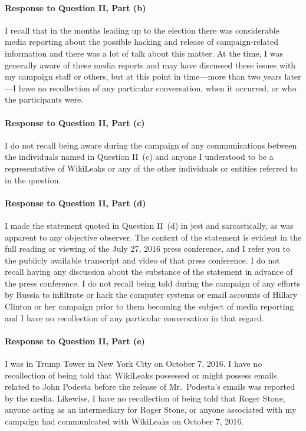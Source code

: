 \paragraph*{Response to Question II, Part (b)}

I recall that in the months leading up to the election there was considerable media reporting about the possible hacking and release of campaign-related information and there was a lot of talk about this matter.
At the time, I was generally aware of these media reports and may have discussed these issues with my campaign staff or others, but at this point in time---more than two years later---I have no recollection of any particular conversation, when it occurred, or who the participants were.

\paragraph*{Response to Question II, Part (c)}

I do not recall being aware during the campaign of any communications between the individuals named in Question II~(c) and anyone I understood to be a representative of WikiLeaks or any of the other individuals or entities referred to in the question.

\paragraph*{Response to Question II, Part (d)}

I made the statement quoted in Question II~(d) in jest and sarcastically, as was apparent to any objective observer.
The context of the statement is evident in the full reading or viewing of the July 27, 2016 press conference, and I refer you to the publicly available transcript and video of that press conference.
I do not recall having any discussion about the substance of the statement in advance of the press conference.
I do not recall being told during the campaign of any efforts by Russia to infiltrate or hack the computer systems or email accounts of Hillary Clinton or her campaign prior to them becoming the subject of media reporting and I have no recollection of any particular conversation in that regard.

\paragraph*{Response to Question II, Part (e)}

I was in Trump Tower in New York City on October 7, 2016.
I have no recollection of being told that WikiLeaks possessed or might possess emails related to John Podesta before the release of Mr.~Podesta’s emails was reported by the media.
Likewise, I have no recollection of being told that Roger Stone, anyone acting as an intermediary for Roger Stone, or anyone associated with my campaign had communicated with WikiLeaks on October 7, 2016.

